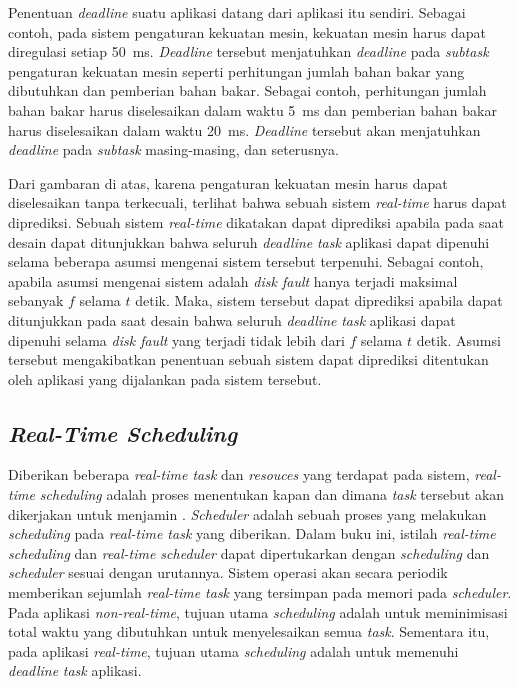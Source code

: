 Penentuan \textit{deadline} suatu aplikasi datang dari aplikasi itu sendiri.  Sebagai contoh,
pada sistem pengaturan kekuatan mesin, kekuatan mesin harus dapat diregulasi setiap
\SI{50}{\milli\second}.  \textit{Deadline} tersebut menjatuhkan \textit{deadline} pada
\textit{subtask} pengaturan kekuatan mesin seperti perhitungan jumlah bahan bakar yang
dibutuhkan dan pemberian bahan bakar.  Sebagai contoh, perhitungan jumlah bahan bakar harus
diselesaikan dalam waktu \SI{5}{\milli\second} dan pemberian bahan bakar harus diselesaikan
dalam waktu \SI{20}{\milli\second}.  \textit{Deadline} tersebut akan menjatuhkan
\textit{deadline} pada \textit{subtask} masing-masing, dan seterusnya.

Dari gambaran di atas, karena pengaturan kekuatan mesin harus dapat diselesaikan tanpa
terkecuali, terlihat bahwa sebuah sistem \textit{real-time} harus dapat diprediksi.  Sebuah
sistem \textit{real-time} dikatakan dapat diprediksi apabila pada saat desain dapat ditunjukkan
bahwa seluruh \textit{deadline} \textit{task} aplikasi dapat dipenuhi selama beberapa asumsi
mengenai sistem tersebut terpenuhi.  Sebagai contoh, apabila asumsi mengenai sistem adalah
\textit{disk fault} hanya terjadi maksimal sebanyak $f$ selama $t$ detik.  Maka, sistem tersebut
dapat diprediksi apabila dapat ditunjukkan pada saat desain bahwa seluruh \textit{deadline}
\textit{task} aplikasi dapat dipenuhi selama \textit{disk fault} yang terjadi tidak lebih dari
$f$ selama $t$ detik.  Asumsi tersebut mengakibatkan penentuan sebuah sistem dapat diprediksi
ditentukan oleh aplikasi yang dijalankan pada sistem tersebut.

\subsection{\textit{Real-Time Scheduling}}

Diberikan beberapa \textit{real-time task} dan \textit{resouces} yang terdapat pada sistem,
\textit{real-time scheduling} adalah proses menentukan kapan dan dimana \textit{task} tersebut
akan dikerjakan untuk menjamin \cite[pp.~8-9]{Shin1994}.  \textit{Scheduler} adalah sebuah
proses yang melakukan \textit{scheduling} pada \textit{real-time task} yang diberikan.  Dalam
buku ini, istilah \textit{real-time scheduling} dan \textit{real-time scheduler} dapat
dipertukarkan dengan \textit{scheduling} dan \textit{scheduler} sesuai dengan urutannya.  Sistem
operasi akan secara periodik memberikan sejumlah \textit{real-time task} yang tersimpan pada
memori pada \textit{scheduler}.  Pada aplikasi \textit{non-real-time}, tujuan utama
\textit{scheduling} adalah untuk meminimisasi total waktu yang dibutuhkan untuk menyelesaikan
semua \textit{task}.  Sementara itu, pada aplikasi \textit{real-time}, tujuan utama
\textit{scheduling} adalah untuk memenuhi \textit{deadline} \textit{task} aplikasi.


